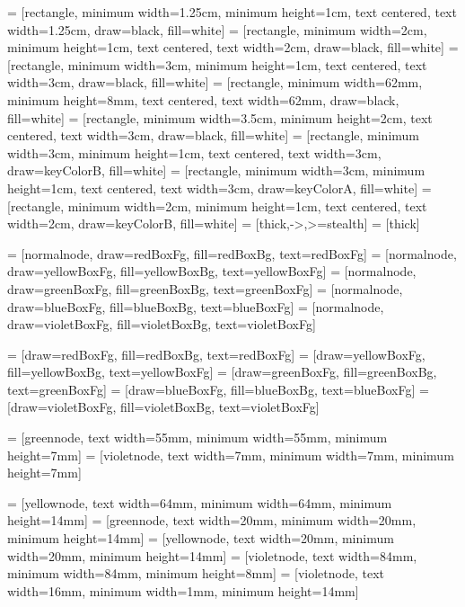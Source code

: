 



 = [rectangle, minimum width=1.25cm, minimum height=1cm, text centered, text width=1.25cm, draw=black, fill=white]
 = [rectangle, minimum width=2cm, minimum height=1cm, text centered, text width=2cm, draw=black, fill=white]
 = [rectangle, minimum width=3cm, minimum height=1cm, text centered, text width=3cm, draw=black, fill=white]
 = [rectangle, minimum width=62mm, minimum height=8mm, text centered, text width=62mm, draw=black, fill=white]
 = [rectangle, minimum width=3.5cm, minimum height=2cm, text centered, text width=3cm, draw=black, fill=white]
 = [rectangle, minimum width=3cm, minimum height=1cm, text centered, text width=3cm, draw=keyColorB, fill=white]
 = [rectangle, minimum width=3cm, minimum height=1cm, text centered, text width=3cm, draw=keyColorA, fill=white]
 = [rectangle, minimum width=2cm, minimum height=1cm, text centered, text width=2cm, draw=keyColorB, fill=white]
 = [thick,->,>=stealth]
 = [thick]

 = [normalnode, draw=redBoxFg, fill=redBoxBg, text=redBoxFg]
 = [normalnode, draw=yellowBoxFg, fill=yellowBoxBg, text=yellowBoxFg]
 = [normalnode, draw=greenBoxFg, fill=greenBoxBg, text=greenBoxFg]
 = [normalnode, draw=blueBoxFg, fill=blueBoxBg, text=blueBoxFg]
 = [normalnode, draw=violetBoxFg, fill=violetBoxBg, text=violetBoxFg]

 = [draw=redBoxFg, fill=redBoxBg, text=redBoxFg]
 = [draw=yellowBoxFg, fill=yellowBoxBg, text=yellowBoxFg]
 = [draw=greenBoxFg, fill=greenBoxBg, text=greenBoxFg]
 = [draw=blueBoxFg, fill=blueBoxBg, text=blueBoxFg]
 = [draw=violetBoxFg, fill=violetBoxBg, text=violetBoxFg]

 = [greennode, text width=55mm, minimum width=55mm, minimum height=7mm]
 = [violetnode, text width=7mm, minimum width=7mm, minimum height=7mm]

 = [yellownode, text width=64mm, minimum width=64mm, minimum height=14mm]
 = [greennode, text width=20mm, minimum width=20mm, minimum height=14mm]
 = [yellownode, text width=20mm, minimum width=20mm, minimum height=14mm]
 = [violetnode, text width=84mm, minimum width=84mm, minimum height=8mm]
 = [violetnode, text width=16mm, minimum width=1mm, minimum height=14mm]
\newcommand{\consumerBox}[1]{{\color{greenBoxFg}\colorbox{greenBoxBg}{#1}}}
\newcommand{\producerBox}[1]{{\color{yellowBoxFg}\colorbox{yellowBoxBg}{#1}}}

